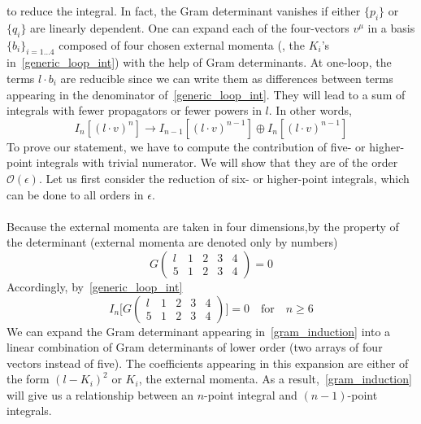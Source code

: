 to reduce the integral.
In fact, the Gram determinant vanishes if either $\{p_i\}$ or $\{q_i\}$ are linearly dependent.
One can expand each of the four-vectors $v^\mu$ in a basis $\{b_i\}_{i=1\ldots 4}$ composed of four chosen external momenta (\ie , the $K_i$'s in~\cref{generic_loop_int}) with the help of Gram determinants.
At one-loop, the terms $l\cdot b_i$ are reducible since we can write them as differences between terms appearing in the denominator of~\cref{generic_loop_int}.
They will lead to a sum of integrals with fewer propagators or fewer powers in $l$. 
In other words, 
\begin{equation}
I_n[(l\cdot v)^n] \rightarrow I_{n-1}[(l\cdot v)^{n-1}]\oplus I_n[(l\cdot v)^{n-1}]
\end{equation}
To prove our statement, we have to compute the contribution of five- or higher-point integrals with trivial numerator. 
We will show that they are of the order $\mathcal{O}(\epsilon)$.
Let us first consider the reduction of six- or higher-point integrals, which can be done to all orders in $\epsilon$. 
\\\\
Because the external momenta are taken in four dimensions,by the property of the determinant (external momenta are denoted only by numbers) 
\begin{equation}
G\begin{pmatrix}
l & 1 & 2 & 3 & 4\\
5 & 1 & 2 & 3 & 4 
\end{pmatrix}
 = 0
\end{equation}
Accordingly, by~\cref{generic_loop_int}
\begin{equation}\label{gram_induction}
I_n\Big[G\begin{pmatrix}
l & 1 & 2 & 3 & 4\\
5 & 1 & 2 & 3 & 4 
\end{pmatrix}\Big]
 = 0
 \quad\mathrm{for}\quad n\geq 6
\end{equation}
We can expand the Gram determinant appearing in~\cref{gram_induction} into a linear combination of Gram determinants of lower order (two arrays of four vectors instead of five).
The coefficients appearing in this expansion are either of the form $(l-K_i)^2$ or $K_i$, the external momenta.
As a result,~\cref{gram_induction} will give us a relationship between an $n$-point integral and $(n-1)$-point integrals.
\\\\
